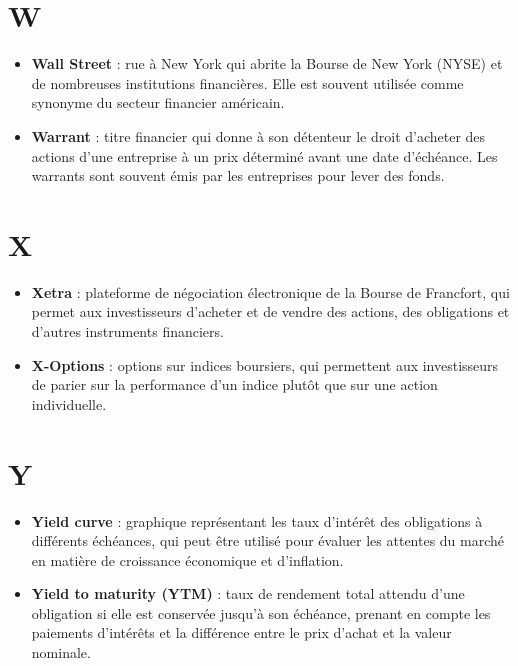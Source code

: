 \documentclass[a4paper,10pt]{article}
\begin{document}
\begin{multicols}{2}
\section*{W}
\begin{itemize}
  \item \textbf{Wall Street} : rue à New York qui abrite la Bourse de New York (NYSE) et de nombreuses institutions financières. Elle est souvent utilisée comme synonyme du secteur financier américain.
  \item \textbf{Warrant} : titre financier qui donne à son détenteur le droit d’acheter des actions d’une entreprise à un prix déterminé avant une date d’échéance. Les warrants sont souvent émis par les entreprises pour lever des fonds.
\end{itemize}

\section*{X}
\begin{itemize}
  \item \textbf{Xetra} : plateforme de négociation électronique de la Bourse de Francfort, qui permet aux investisseurs d’acheter et de vendre des actions, des obligations et d’autres instruments financiers.
  \item \textbf{X-Options} : options sur indices boursiers, qui permettent aux investisseurs de parier sur la performance d’un indice plutôt que sur une action individuelle.
\end{itemize}

\section*{Y}
\begin{itemize}
  \item \textbf{Yield curve} : graphique représentant les taux d’intérêt des obligations à différents échéances, qui peut être utilisé pour évaluer les attentes du marché en matière de croissance économique et d’inflation.
  \item \textbf{Yield to maturity (YTM)} : taux de rendement total attendu d’une obligation si elle est conservée jusqu’à son échéance, prenant en compte les paiements d’intérêts et la différence entre le prix d’achat et la valeur nominale.
\end{itemize}


\end{multicols}
\end{document}
